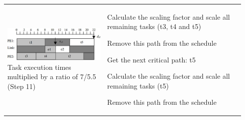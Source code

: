 \begin{longtable}{p{0.4\linewidth}p{0.55\linewidth}}
			\includegraphics[scale=0.3]{./pictures/voltage_scheduling_4.png} \newline
				Task execution times multiplied by a ratio of 7/5.5 (Step 11)			
			&
				\vspace{-90pt}
				\begin{compactenum}	
					\setcounter{enumi}{7}
					\item Calculate the scaling factor and scale all remaining tasks (t3, t4 and t5)
					\item Remove this path from the schedule	
					\item Get the next critical path: t5
					\item Calculate the scaling factor and scale all remaining tasks (t5)
					\item Remove this path from the schedule
				\end{compactenum}	\\
		\end{longtable}
	
%	
%	
%	
